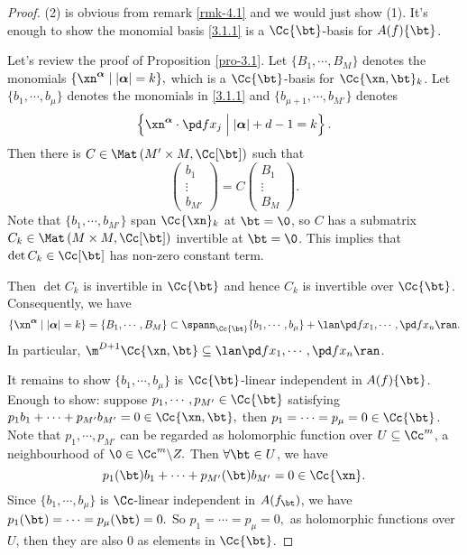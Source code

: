   \begin{proof}
    (2) is obvious from remark \ref{rmk-4.1} and we would just show (1). It's enough to show the monomial basis \eqref{3.1.1} is a $\Cc\{\bt\}$-basis for $A(f)\{\bt\}$. 

    Let's review the proof of Proposition \ref{pro-3.1}. 
    Let $\{B_1,\cdots, B_M\}$ denotes the monomials $\{\xn^{\boldsymbol{\alpha}} \mid |\boldsymbol{\alpha}| = k \},$  which is a $\Cc\{\bt\}$-basis for $\Cc\{\xn,\bt\}_k$. Let $\{b_1,\cdots, b_\mu\}$ denotes the monomials in \eqref{3.1.1} and $\{b_{\mu+1},\cdots, b_{M'}\}$ denotes
    \[\left\{ \xn^{\boldsymbol \alpha}\cdot \pd f{x_j} \Bigm| |\boldsymbol \alpha |+d-1=k \right\}.\]
    Then there is $C\in \Mat\left( M' \times M , \Cc[\bt] \right)$ such that
    \[\begin{pmatrix}
      b_1\\
      \vdots\\
      b_{M'}
    \end{pmatrix}
    =
    C
    \begin{pmatrix}
      B_1\\
      \vdots\\
      B_M
    \end{pmatrix}
  .\]
  Note that $\{b_1,\cdots, b_{M'}\}$ span $\Cc\{\xn\}_k$ at $\bt=\0$,  so $C$ has a submatrix $C_k\in \Mat\left(M\times M, \Cc[\bt]\right)$ invertible at $\bt=\0$.  This implies that $\det C_k \in \Cc[\bt]$ has non-zero constant term. 

  Then $\det C_k$ is invertible in $\Cc\{\bt\}$ and hence $C_k$ is invertible over $\Cc\{\bt\}$. Consequently, we have
  \[\{\xn^{\boldsymbol{\alpha}} \mid |\boldsymbol{\alpha}| = k \} = \{B_1,\cdots, B_M \}\subset  \spann_{\Cc\{\bt\}}\{ b_1,\cdots, b_\mu\} + \lan \pd f{x_1},\cdots, \pd f{x_n} \ran.\]
  In particular, $\m^{D+1}\Cc\{\xn, \bt\} \subseteq  \lan \pd f{x_1},\cdots, \pd f{x_n} \ran$.

  It remains to show $\{b_1,\cdots, b_\mu\}$ is $\Cc\{\bt\}$-linear independent in $A(f)\{\bt\}$. Enough to show: suppose $p_1,\cdots, p_{M'} \in \Cc\{\bt\}$ satisfying $p_1b_1+\cdots+p_{M'}b_{M'}=0\in \Cc\{\xn,\bt\},$ then $p_1=\cdots=p_\mu=0\in \Cc\{\bt\}$. Note that $p_1,\cdots, p_{M'}$ can be regarded as holomorphic function over $U\subseteq \Cc^m$, a neighbourhood of $\0 \in  \Cc^m\backslash Z.$ Then $\forall \bt\in U$, we have
  \[p_1(\bt)b_1+\cdots+p_{M'}(\bt)b_{M'}=0\in \Cc\{\xn\}.\]
  Since $\{b_1,\cdots, b_\mu\}$ is $\Cc$-linear independent in $A(f_\bt)$, we have $p_1(\bt)=\cdots=p_ \mu(\bt)=0.$ So $p_1=\cdots=p_\mu=0,$ as holomorphic functions over $U$, then they are also $0$ as elements in $\Cc\{\bt\}$.
\end{proof}
